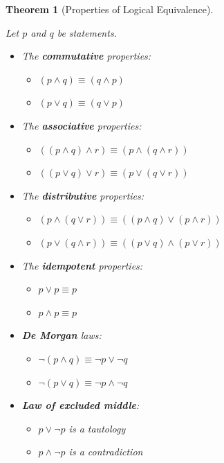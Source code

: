 \documentclass[
  letterpaper,
  10pt,
  reqno,
  twopage,
  openany]{book}
\providecommand{\tightlist}{%
  \setlength{\itemsep}{0pt}\setlength{\parskip}{0pt}}\usepackage{longtable,booktabs,array}
\theoremstyle{plain}
\theoremstyle{definition}
\theoremstyle{definition}
\theoremstyle{definition}
\theoremstyle{plain}
\theoremstyle{plain}
\newtheorem{theorem}{Theorem}[chapter]
\theoremstyle{remark}
\begin{document}
\leavevmode{}%
\begin{theorem}[Properties of Logical Equivalence]\label{thm-ple}

Let \(p\) and \(q\) be statements.

\begin{itemize}
\tightlist
\item
  The  \textbf{commutative} properties:

  \begin{itemize}
  \tightlist
  \item
    \((p\land q)\equiv (q\land p)\)
  \item
    \((p\lor q)\equiv (q\lor p)\)
  \end{itemize}
\item
  The  \textbf{associative} properties:

  \begin{itemize}
  \tightlist
  \item
    \(((p\land q)\land r) \equiv (p\land (q\land r))\)
  \item
    \(((p\lor q)\lor r) \equiv (p\lor (q\lor r))\)
  \end{itemize}
\item
  The  \textbf{distributive} properties:

  \begin{itemize}
  \tightlist
  \item
    \((p\land (q\lor r)) \equiv ((p\land q)\lor (p\land r))\)
  \item
    \((p\lor (q\land r)) \equiv ((p\lor q)\land (p\lor r))\)
  \end{itemize}
\item
  The  \textbf{idempotent} properties:

  \begin{itemize}
  \tightlist
  \item
    \(p\lor p \equiv p\)
  \item
    \(p\land p \equiv p\)
  \end{itemize}
\item
   \textbf{De Morgan} laws:

  \begin{itemize}
  \tightlist
  \item
    \(\neg (p\land q)\equiv \neg p \lor \neg q\)
  \item
    \(\neg (p\lor q)\equiv \neg p \land \neg q\)
  \end{itemize}
\item
   \textbf{Law of excluded middle}:

  \begin{itemize}
  \tightlist
  \item
    \(p\lor \neg p\) is a tautology
  \item
    \(p\land \neg p\) is a contradiction
  \end{itemize}
\end{itemize}

\end{theorem}
\end{document}
